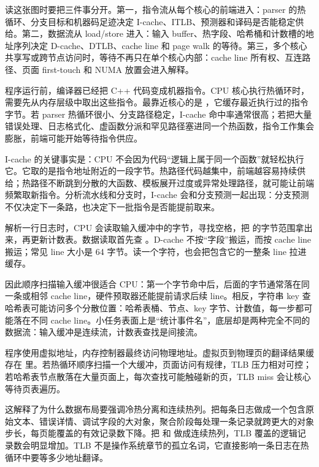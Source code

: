 读这张图时要把三件事分开。第一，指令流从每个核心的前端进入：parser 的热循环、分支目标和机器码足迹决定 I-cache、ITLB、预测器和译码是否能稳定供给。第二，数据流从 load/store 进入：输入 buffer、热字段、哈希桶和计数槽的地址序列决定 D-cache、DTLB、cache line 和 page walk 的等待。第三，多个核心共享写或跨节点访问时，等待不再只在单个核心内部：cache line 所有权、互连路径、页面 first-touch 和 NUMA 放置会进入解释。

程序运行前，编译器已经把 C++ 代码变成机器指令。CPU 核心执行热循环时，需要先从内存层级中取出这些指令。最靠近核心的是 ，它缓存最近执行过的指令字节。若 parser 热循环很小、分支路径稳定，I-cache 命中率通常很高；若把大量错误处理、日志格式化、虚函数分派和罕见路径塞进同一个热函数，指令工作集会膨胀，前端可能开始等待指令供应。

I-cache 的关键事实是：CPU 不会因为代码“逻辑上属于同一个函数”就轻松执行它。它取的是指令地址附近的一段字节。热路径代码越集中，前端越容易持续供给；热路径不断跳到分散的大函数、模板展开过度或异常处理路径，就可能让前端频繁取新指令。分析流水线和分支时，I-cache 会和分支预测一起出现：分支预测不仅决定下一条路，也决定下一批指令是否能提前取来。

解析一行日志时，CPU 会读取输入缓冲中的字节，寻找空格，把  的字节范围拿出来，再更新计数表。数据读取首先查 。D-cache 不按“字段”搬运，而按 cache line 搬运；常见 line 大小是 64 字节。读一个字符，也会把包含它的一整条 line 拉进缓存。

因此顺序扫描输入缓冲很适合 CPU：第一个字节命中后，后面的字节通常落在同一条或相邻 cache line，硬件预取器还能提前请求后续 line。相反，字符串 key 查哈希表可能访问多个分散位置：哈希表桶、节点、key 字节、计数值，每一步都可能落在不同 cache line。小任务表面上是“统计事件名”，底层却是两种完全不同的数据流：输入缓冲是连续流，计数表查找是间接流。

程序使用虚拟地址，内存控制器最终访问物理地址。虚拟页到物理页的翻译结果缓存在  里。若热循环顺序扫描一个大缓冲，页面访问有规律，TLB 压力相对可控；若哈希表节点散落在大量页面上，每次查找可能触碰新的页，TLB miss 会让核心等待页表遍历。

这解释了为什么数据布局要强调冷热分离和连续热列。把每条日志做成一个包含原始文本、错误详情、调试字段的大对象，聚合阶段每处理一条记录就跨更大的对象步长，每页能覆盖的有效记录数下降。把  和  做成连续热列，TLB 覆盖的逻辑记录数会明显增加。TLB 不是操作系统章节的孤立名词，它直接影响一条日志在热循环中要等多少地址翻译。

